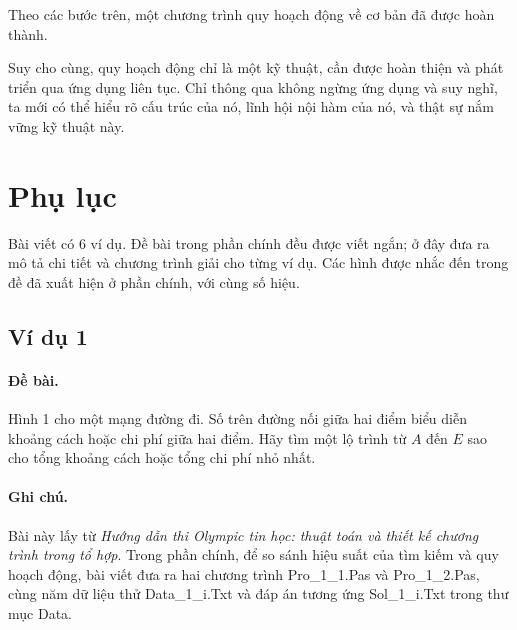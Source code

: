 \documentclass[11pt]{article}
\begin{document}
Theo các bước trên, một chương trình quy hoạch động về cơ bản đã được hoàn
thành.

Suy cho cùng, quy hoạch động chỉ là một kỹ thuật, cần được hoàn thiện và phát
triển qua ứng dụng liên tục. Chỉ thông qua không ngừng ứng dụng và suy nghĩ,
ta mới có thể hiểu rõ cấu trúc của nó, lĩnh hội nội hàm của nó, và thật sự
nắm vững kỹ thuật này.

\appendix
\section{Phụ lục}

Bài viết có 6 ví dụ. Đề bài trong phần chính đều được viết ngắn; ở đây đưa ra
mô tả chi tiết và chương trình giải cho từng ví dụ. Các hình được nhắc đến
trong đề đã xuất hiện ở phần chính, với cùng số hiệu.

\subsection{Ví dụ 1}

\paragraph{Đề bài.}
Hình 1 cho một mạng đường đi. Số trên đường nối giữa hai điểm biểu diễn
khoảng cách hoặc chi phí giữa hai điểm. Hãy tìm một lộ trình từ \(A\) đến
\(E\) sao cho tổng khoảng cách hoặc tổng chi phí nhỏ nhất.

\paragraph{Ghi chú.}
Bài này lấy từ \textit{Hướng dẫn thi Olympic tin học: thuật toán và thiết kế
chương trình trong tổ hợp}. Trong phần chính, để so sánh hiệu suất của tìm
kiếm và quy hoạch động, bài viết đưa ra hai chương trình Pro\_1\_1.Pas và
Pro\_1\_2.Pas, cùng năm dữ liệu thử Data\_1\_i.Txt và đáp án tương ứng
Sol\_1\_i.Txt trong thư mục Data.
\end{document}
